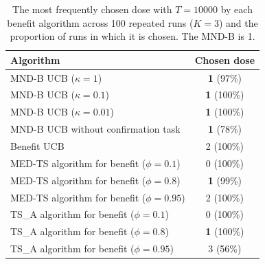 \begin{table}[tb]
\centering
\caption{The most frequently chosen dose with $T=10000$ by each benefit algorithm across 100 repeated runs ($K=3$) and the proportion of runs in which it is chosen. The MND-B is 1.}
\label{tab:table6}
\begin{tabular}{lc}
\hline
Algorithm & Chosen dose \\
\hline
MND-B UCB ($\kappa=1$) & \textbf{1} (97\%) \\
MND-B UCB ($\kappa=0.1$) & \textbf{1} (100\%) \\
MND-B UCB ($\kappa=0.01$) & \textbf{1} (100\%) \\
\hline
MND-B UCB without confirmation task & \textbf{1} (78\%) \\
Benefit UCB & 2 (100\%) \\
MED-TS algorithm for benefit ($\phi=0.1$) & 0 (100\%) \\
MED-TS algorithm for benefit ($\phi=0.8$) & \textbf{1} (99\%) \\
MED-TS algorithm for benefit ($\phi=0.95$) & 2 (100\%) \\
TS\_A algorithm for benefit ($\phi=0.1$) & 0 (100\%) \\
TS\_A algorithm for benefit ($\phi=0.8$) & \textbf{1} (100\%) \\
TS\_A algorithm for benefit ($\phi=0.95$) & 3 (56\%) \\
\hline
\end{tabular}
\end{table}
